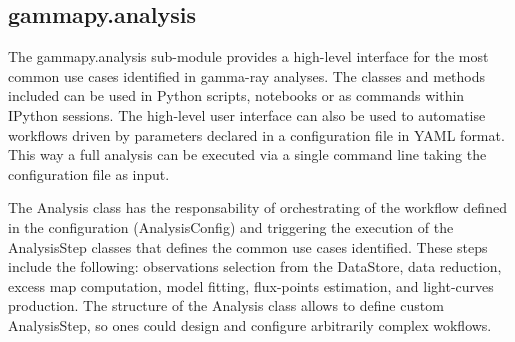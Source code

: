 \subsection{gammapy.analysis}
\label{ssec:gammapy-analysis}

The gammapy.analysis sub-module provides a  high-level interface for the most
common use cases identified in gamma-ray analyses. The classes and methods
included can be used in Python scripts, notebooks or as commands within IPython
sessions. The high-level user interface can also be used to automatise
workflows driven by parameters declared in a configuration file in YAML format.
This way a full analysis can be executed via a single command line taking the
configuration file as input.

The Analysis class has the responsability of orchestrating of the workflow
defined in the configuration (AnalysisConfig) and triggering the execution of
the AnalysisStep classes that defines the common use cases identified. These
steps include the following: observations selection from the DataStore,  data
reduction, excess map computation, model fitting, flux-points estimation, and
light-curves production. The structure of the Analysis class allows to define
custom AnalysisStep,  so ones could design and configure arbitrarily complex
wokflows.

